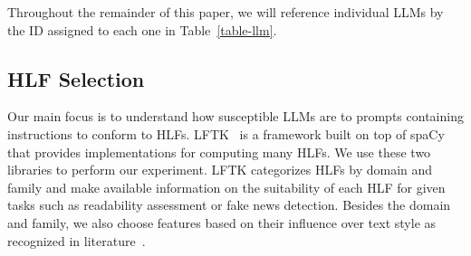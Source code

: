 \documentclass[11pt]{article}
\begin{document}
\begin{table}[ht!]
    \setlength\tabcolsep{6pt}
    \centering
    \caption{Large Language Model Selection}\label{table-llm}
\end{table}

Throughout the remainder of this paper, we will reference individual LLMs by the
ID assigned to each one in Table~\ref{table-llm}.

\subsection{HLF Selection}\label{hlf-selection}

Our main focus is to understand how susceptible LLMs are to prompts containing
instructions to conform to HLFs.
LFTK~\cite{lftk-2023} is a framework built on top of spaCy~\cite{spacy}
that provides implementations for computing many HLFs.
We use these two libraries to perform our experiment.
LFTK categorizes HLFs by domain and family and make available information on the
suitability of each HLF for given tasks such as readability assessment or fake
news detection.
Besides the domain and family, we also choose features based on their influence
over text style as recognized in literature~\cite{verma2019lexical,lugea2023stylistics}.
\end{document}
